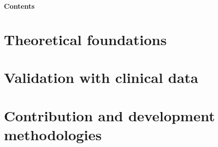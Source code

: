\documentclass[12pt]{memoir}
\begin{document}
\thispagestyle{empty}


\newpage
\normalsize
\renewcommand{\contentsname}{} 
\par\noindent\textbf{\huge{\color{blue}Contents}}
\tableofcontents

\newpage
\normalsize


\linespread{1.5}

\normalsize


\newpage
\normalsize

\part[Theoretical foundations]{Theoretical foundations}



\newpage
\normalsize

\newpage
\normalsize
\part[Validation wth clinical data]{Validation with clinical data}

\newpage
\normalsize


\newpage
\normalsize
\part[ Contribution and development methodologies]{ Contribution and development methodologies}

\newpage
\normalsize


\newpage
\normalsize
\end{document}

